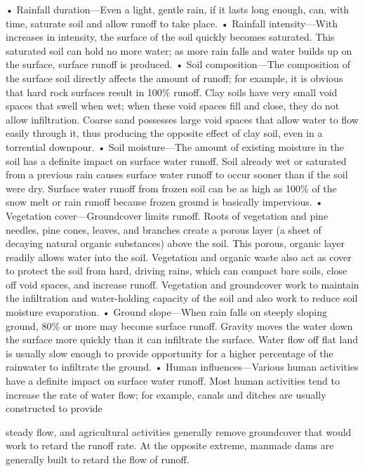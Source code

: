 \documentclass{article}
\begin{document}
• Rainfall duration---Even a light, gentle rain, if it lasts long
enough, can, with time, saturate soil and allow runoff to take place. •
Rainfall intensity---With increases in intensity, the surface of the
soil quickly becomes saturated. This saturated soil can hold no more
water; as more rain falls and water builds up on the surface, surface
runoff is produced. • Soil composition---The composition of the surface
soil directly affects the amount of runoff; for example, it is obvious
that hard rock surfaces result in 100\% runoff. Clay soils have very
small void spaces that swell when wet; when these void spaces fill and
close, they do not allow infiltration. Coarse sand possesses large void
spaces that allow water to flow easily through it, thus producing the
opposite effect of clay soil, even in a torrential downpour. • Soil
moisture---The amount of existing moisture in the soil has a definite
impact on surface water runoff. Soil already wet or saturated from a
previous rain causes surface water runoff to occur sooner than if the
soil were dry. Surface water runoff from frozen soil can be as high as
100\% of the snow melt or rain runoff because frozen ground is basically
impervious. • Vegetation cover---Groundcover limits runoff. Roots of
vegetation and pine needles, pine cones, leaves, and branches create a
porous layer (a sheet of decaying natural organic substances) above the
soil. This porous, organic layer readily allows water into the soil.
Vegetation and organic waste also act as cover to protect the soil from
hard, driving rains, which can compact bare soils, close off void
spaces, and increase runoff. Vegetation and groundcover work to maintain
the infiltration and water-holding capacity of the soil and also work to
reduce soil moisture evaporation. • Ground slope---When rain falls on
steeply sloping ground, 80\% or more may become surface runoff. Gravity
moves the water down the surface more quickly than it can infiltrate the
surface. Water flow off flat land is usually slow enough to provide
opportunity for a higher percentage of the rainwater to infiltrate the
ground. • Human influences---Various human activities have a definite
impact on surface water runoff. Most human activities tend to increase
the rate of water flow; for example, canals and ditches are usually
constructed to provide

steady flow, and agricultural activities generally remove groundcover
that would work to retard the runoff rate. At the opposite extreme,
manmade dams are generally built to retard the flow of runoff.
\end{document}
